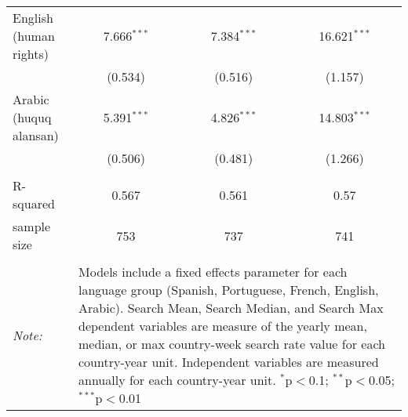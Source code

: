 \begin{table}[!htbp]
\begin{tabular}{@{\extracolsep{5pt}}lccc}
  English (human rights) & 7.666$^{***}$ & 7.384$^{***}$ & 16.621$^{***}$ \\ 
  & (0.534) & (0.516) & (1.157) \\ 
  Arabic (huquq alansan) & 5.391$^{***}$ & 4.826$^{***}$ & 14.803$^{***}$ \\ 
  & (0.506) & (0.481) & (1.266) \\ 
 \hline \\[-1.8ex] 
R-squared  & 0.567 & 0.561 & 0.57 \\ 
sample size  & 753 & 737 & 741 \\ 
\hline 
\hline \\[-1.8ex] 
\textit{Note:}  & \multicolumn{3}{l}{\parbox[t]{8cm}{Models include a fixed effects parameter for each language group (Spanish, Portuguese, French, English, Arabic). Search Mean, Search Median, and Search Max dependent variables are measure of the yearly mean, median, or max country-week search rate value for each country-year unit. Independent variables are measured annually for each country-year unit. $^{*}$p$<$0.1; $^{**}$p$<$0.05; $^{***}$p$<$0.01}} \\ 
\end{tabular} 
\end{table} 
